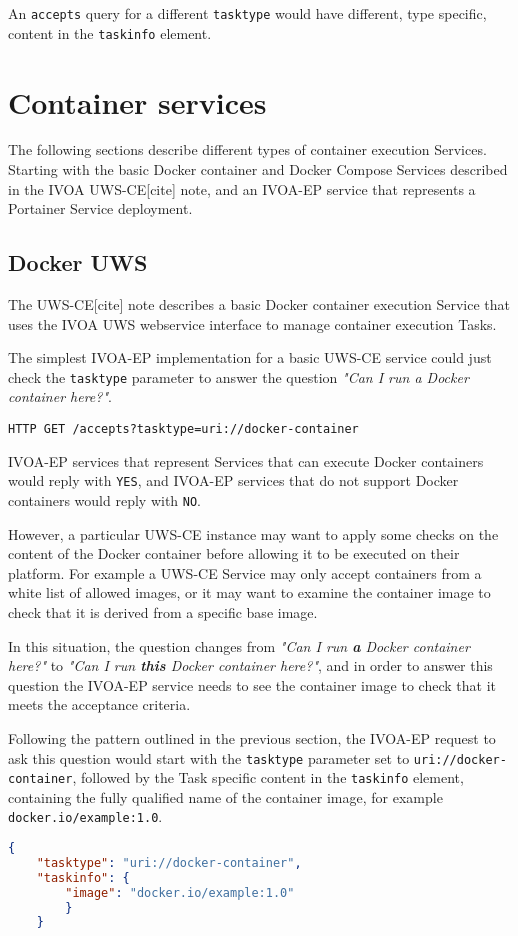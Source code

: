 \documentclass[11pt,a4paper]{ivoa}
\newcommand{\webservice} {webservice\xspace}
\newcommand{\uws} {UWS\xspace}
\newcommand{\uwsce} {UWS-CE\xspace}
\newcommand{\ivoa} {IVOA\xspace}
\newcommand{\ivoep} {IVOA-EP\xspace}
\newcommand{\docker} {Docker\xspace}
\newcommand{\dockercompose} {Docker Compose\xspace}
\newcommand{\portainer} {Portainer\xspace}
\newcommand{\codeword}[1] {\texttt{#1}}
\begin{document}
An \codeword{accepts} query for a different \codeword{tasktype} would have different, type specific, content in the \codeword{taskinfo} element.

\section{Container services}
\label{sec:container-services}
The following sections describe different types of container execution Services. Starting with the basic \docker container and \dockercompose Services described in the \ivoa \uwsce[cite] note, and an \ivoep service that represents a \portainer Service deployment.

\subsection{Docker UWS}
\label{sec:uri://docker-uws}
The \uwsce[cite] note describes a basic \docker container execution Service that uses the \ivoa \uws \webservice interface to manage container execution Tasks.

The simplest \ivoep implementation for a basic \uwsce service could just check the \codeword{tasktype} parameter to answer the question \textit{"Can I run a Docker container here?"}.
\begin{lstlisting}[]
    HTTP GET /accepts?tasktype=uri://docker-container
\end{lstlisting}
\ivoep services that represent Services that can execute \docker containers would reply with \codeword{YES}, and \ivoep services that do not support \docker containers would reply with \codeword{NO}.

However, a particular \uwsce instance may want to apply some checks on the content of the \docker container before allowing it to be executed on their platform.
For example a \uwsce Service may only accept containers from a white list of allowed images, or it may want to examine the container image to check that it is derived from a specific base image.

In this situation, the question changes from \textit{"Can I run \textbf{a} Docker container here?"} to \textit{"Can I run \textbf{this} Docker container here?"}, and in order to answer this question the \ivoep service needs to see the container image to check that it meets the acceptance criteria.

Following the pattern outlined in the previous section, the \ivoep request to ask this question would start with the \codeword{tasktype} parameter set to \codeword{uri://docker-container}, followed by the Task specific content in the \codeword{taskinfo} element, containing the fully qualified name of the container image, for example \codeword{docker.io/example:1.0}.
\begin{lstlisting}[language=json]
    {
    "tasktype": "uri://docker-container",
    "taskinfo": {
        "image": "docker.io/example:1.0"
        }
    }
\end{lstlisting}
\end{document}
